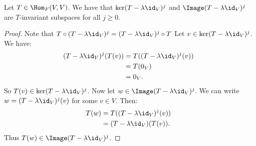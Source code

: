     \begin{lemma}\label{lemma:invariant-eigenspace}
        Let $T \in \Hom_F(V,V)$. We have that $\ker(T-\lambda \id_V)^j$ and $\Image(T - \lambda \id_V)^j$ are $T$-invariant subspaces for all $j \geq 0$.
    \end{lemma}
        \begin{proof}
            Note that $T\circ (T-\lambda\id_V)^j = (T-\lambda\id_V)^j \circ T$ Let $v \in \ker(T-\lambda\id_V)^j$. We have:
                \begin{equation*}
                \begin{split}
                    (T-\lambda\id_V)^j(T(v))
                    & = T((T-\lambda\id_V)^j(v)) \\
                    & = T(0_V) \\
                    & = 0_V.
                \end{split}
                \end{equation*}
            So $T(v) \in \ker(T- \lambda \id_V)^j$. Now let $w \in \Image(T -\lambda \id_V)^j$. We can write $w = (T-\lambda\id_V)^j(v)$ for some $v \in V$. Then:
                \begin{equation*}
                \begin{split}
                    T(w) &= T((T-\lambda \id_V)^j(v)) \\
                    & = (T -\lambda\id_V)(T(v)).
                \end{split}
                \end{equation*}
            Thus $T(w) \in \Image(T -\lambda \id_V)^j$.
        \end{proof}

